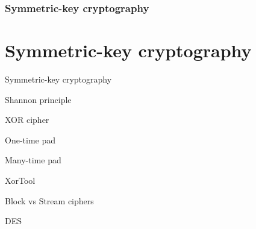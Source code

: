 \section[Section]{Symmetric-key cryptography}
\part{Symmetric-key cryptography}

\begin{frame}{Symmetric-key cryptography}

\end{frame}

\begin{frame}{Shannon principle}

\end{frame}

\begin{frame}{XOR cipher}

\end{frame}

\begin{frame}{One-time pad}

\end{frame}

\begin{frame}{Many-time pad}

\end{frame}

\begin{frame}{XorTool}

\end{frame}

\begin{frame}{Block vs Stream ciphers}

\end{frame}

\begin{frame}{DES}

\end{frame}

